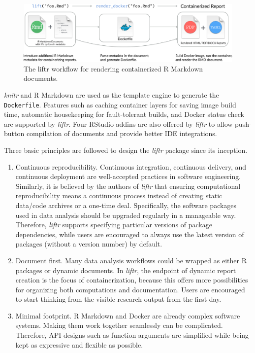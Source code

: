 \begin{figure}[htbp]
  \centering
  \includegraphics[width=\textwidth]{liftr-workflow}
  \caption{The liftr workflow for rendering containerized R Markdown documents.}
  \label{figure:liftr}
\end{figure}

\emph{knitr} and R Markdown are used as the template engine to generate
the \texttt{Dockerfile}. Features such as caching container layers for
saving image build time, automatic housekeeping for fault-tolerant
builds, and Docker status check are supported by \emph{liftr}. Four
RStudio addins are also offered by \emph{liftr} to allow push-button
compilation of documents and provide better IDE integrations.

Three basic principles are followed to design the \emph{liftr} package
since its inception.

\begin{enumerate}
\def\labelenumi{\arabic{enumi}.}
\item
  Continuous reproducibility. Continuous integration, continuous
  delivery, and continuous deployment are well-accepted practices in
  software engineering. Similarly, it is believed by the authors of
  \emph{liftr} that ensuring computational reproducibility means a
  continuous process instead of creating static data/code archives or a
  one-time deal. Specifically, the software packages used in data
  analysis should be upgraded regularly in a manageable way. Therefore,
  \emph{liftr} supports specifying particular versions of package
  dependencies, while users are encouraged to always use the latest
  version of packages (without a version number) by default.
\item
  Document first. Many data analysis workflows could be wrapped as
  either R packages or dynamic documents. In \emph{liftr}, the endpoint
  of dynamic report creation is the focus of containerization, because
  this offers more possibilities for organizing both computations and
  documentation. Users are encouraged to start thinking from the visible
  research output from the first day.
\item
  Minimal footprint. R Markdown and Docker are already complex software
  systems. Making them work together seamlessly can be complicated.
  Therefore, API designs such as function arguments are simplified while
  being kept as expressive and flexible as possible.
\end{enumerate}

